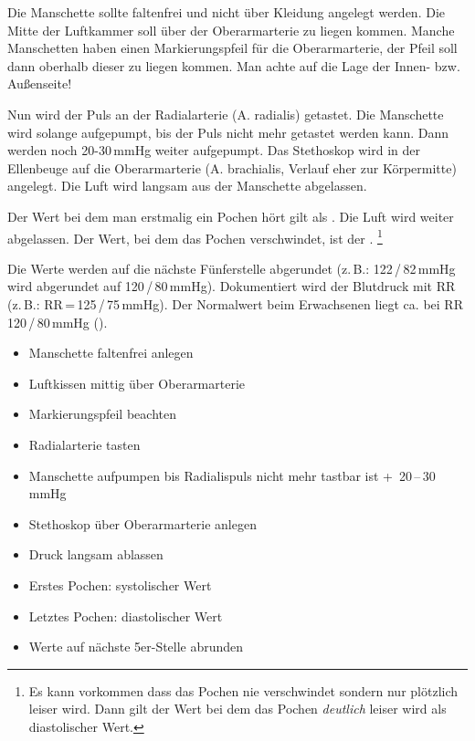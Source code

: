 {%
Die Manschette sollte faltenfrei und nicht über Kleidung angelegt werden. Die
Mitte der Luftkammer soll über der Oberarmarterie zu liegen kommen. Manche
Manschetten haben einen Markierungspfeil für die Oberarmarterie, der Pfeil soll
dann oberhalb dieser zu liegen kommen. Man achte auf die Lage der Innen- bzw.
Außenseite!

Nun wird
der Puls an der Radialarterie (A. radialis) getastet. Die Manschette wird
solange aufgepumpt, bis der Puls nicht mehr getastet werden kann. Dann werden
noch 20-30\,mmHg weiter aufgepumpt. Das Stethoskop wird in der Ellenbeuge auf
die Oberarmarterie (A. brachialis, Verlauf eher zur Körpermitte) angelegt. Die
Luft wird langsam aus der Manschette abgelassen. 

Der Wert bei dem man
erstmalig ein Pochen  hört gilt als
. Die Luft wird weiter abgelassen. Der Wert, bei dem das
Pochen verschwindet, ist der . \footnote{Es kann
vorkommen dass das Pochen nie verschwindet sondern nur plötzlich leiser wird.
Dann gilt der Wert bei dem das Pochen \emph{deutlich} leiser wird als
diastolischer Wert.}

Die
Werte werden auf die nächste Fünferstelle abgerundet (z.\,B.:
122\,/\,82\,mmHg wird abgerundet auf 120\,/\,80\,mmHg). Dokumentiert
wird der Blutdruck mit RR (z.\,B.: RR\,=\,125\,/\,75\,mmHg). Der
Normalwert beim Erwachsenen liegt ca. bei RR 120\,/\,80\,mmHg
().
}{
\begin{itemize}
  \item Manschette faltenfrei anlegen
  \item Luftkissen  mittig über Oberarmarterie
  \item Markierungspfeil beachten
  \item Radialarterie tasten
  \item Manschette aufpumpen bis Radialispuls nicht mehr tastbar ist
  +~20\,--\,30\,mmHg
  \item Stethoskop über Oberarmarterie anlegen
  \item Druck langsam ablassen
  \item Erstes Pochen: systolischer Wert
  \item Letztes Pochen: diastolischer Wert
  \item Werte auf nächste 5er-Stelle abrunden
\end{itemize}

}{}{}{}




